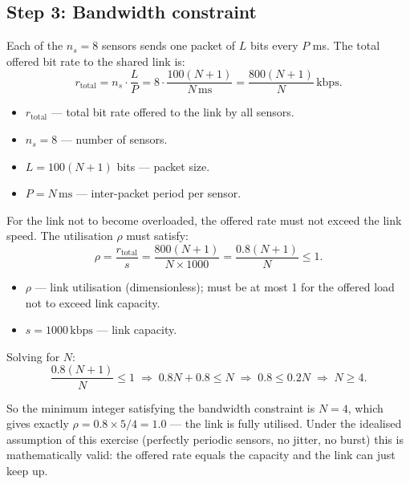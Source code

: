 \documentclass[12pt, a4paper]{article}
\begin{document}
\subsection*{Step 3: Bandwidth constraint}

Each of the $n_s = 8$ sensors sends one packet of $L$ bits every $P$ ms. The
total offered bit rate to the shared link is:
\[
  r_\text{total} = n_s \cdot \frac{L}{P}
  = 8 \cdot \frac{100(N+1)}{N\,\mathrm{ms}}
  = \frac{800(N+1)}{N}\,\mathrm{kbps}.
\]
\begin{itemize}[leftmargin=1.4em, itemsep=2pt]
  \item $r_\text{total}$ --- total bit rate offered to the link by all sensors.
  \item $n_s = 8$ --- number of sensors.
  \item $L = 100(N+1)$ bits --- packet size.
  \item $P = N\,\mathrm{ms}$ --- inter-packet period per sensor.
\end{itemize}

For the link not to become overloaded, the offered rate must not exceed the
link speed. The utilisation $\rho$ must satisfy:
\[
  \rho = \frac{r_\text{total}}{s} = \frac{800(N+1)}{N \times 1000} = \frac{0.8(N+1)}{N} \leq 1.
\]
\begin{itemize}[leftmargin=1.4em, itemsep=2pt]
  \item $\rho$ --- link utilisation (dimensionless); must be at most 1 for the
    offered load not to exceed link capacity.
  \item $s = 1000\,\mathrm{kbps}$ --- link capacity.
\end{itemize}

Solving for $N$:
\[
  \frac{0.8(N+1)}{N} \leq 1
  \;\Longrightarrow\;
  0.8N + 0.8 \leq N
  \;\Longrightarrow\;
  0.8 \leq 0.2N
  \;\Longrightarrow\;
  N \geq 4.
\]

So the minimum integer satisfying the bandwidth constraint is $N = 4$, which
gives exactly $\rho = 0.8 \times 5/4 = 1.0$ --- the link is fully utilised.
Under the idealised assumption of this exercise (perfectly periodic sensors,
no jitter, no burst) this is mathematically valid: the offered rate equals the
capacity and the link can just keep up.
\end{document}
